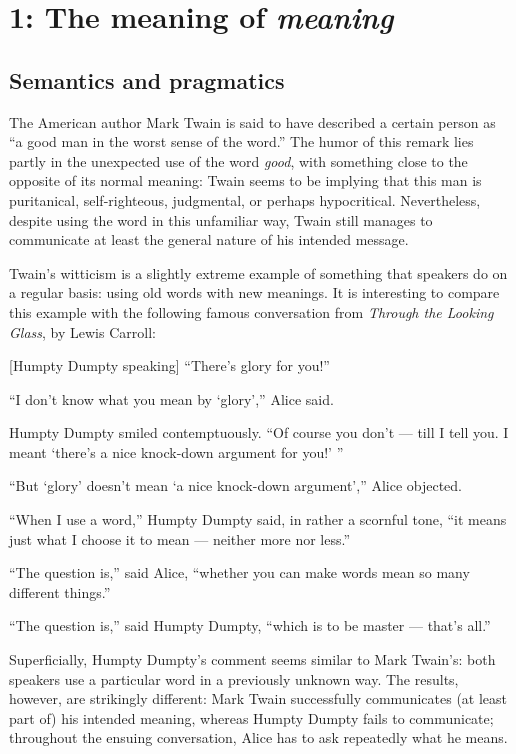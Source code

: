 \chapter{{1}: The meaning of \textit{meaning}}

\section{Semantics and pragmatics}\label{sec:} %

The American author Mark Twain is said to have described a certain person as “a good man in the worst sense of the word.” The humor of this remark lies partly in the unexpected use of the word \textit{good}, with something close to the opposite of its normal meaning: Twain seems to be implying that this man is puritanical, self-righteous, judgmental, or perhaps hypocritical. Nevertheless, despite using the word in this unfamiliar way, Twain still manages to communicate at least the general nature of his intended message.



Twain’s witticism is a slightly extreme example of something that speakers do on a regular basis: using old words with new meanings. It is interesting to compare this example with the following famous conversation from \textit{Through the Looking Glass}, by Lewis Carroll:


\ea
{}[Humpty Dumpty speaking] “There’s glory for you!”

“I don’t know what you mean by ‘glory’,” Alice said.

Humpty Dumpty smiled contemptuously. “Of course you don’t — till I tell you. I meant ‘there’s a nice knock-down argument for you!’ ”

“But ‘glory’ doesn’t mean ‘a nice knock-down argument’,” Alice objected. 

“When I use a word,” Humpty Dumpty said, in rather a scornful tone, “it means just what I choose it to mean — neither more nor less.”

“The question is,” said Alice, “whether you can make words mean so many different things.”

“The question is,” said Humpty Dumpty, “which is to be master — that’s all.”
\z

Superficially, Humpty Dumpty’s comment seems similar to Mark Twain’s: both speakers use a particular word in a previously unknown way. The results, however, are strikingly different: Mark Twain successfully communicates (at least part of) his intended meaning, whereas Humpty Dumpty fails to communicate; throughout the ensuing conversation, Alice has to ask repeatedly what he means.



